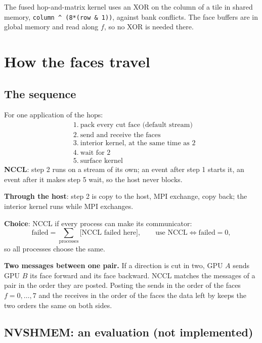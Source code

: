 \documentclass[11pt,a4paper]{article}
\numberwithin{equation}{section}
\newcommand{\code}[1]{\texttt{\small #1}}
\begin{document}
The fused hop-and-matrix kernel uses an XOR on the column of a tile in shared memory,
\code{column \^{} (8*(row \& 1))}, against bank conflicts. The face buffers are in global memory
and read along $f$, so no XOR is needed there.

\section{How the faces travel}

\subsection{The sequence}

For one application of the hops:
\begin{align*}
&1.\ \text{pack every cut face (default stream)}\\
&2.\ \text{send and receive the faces}\\
&3.\ \text{interior kernel, at the same time as 2}\\
&4.\ \text{wait for 2}\\
&5.\ \text{surface kernel}
\end{align*}
\textbf{NCCL}: step 2 runs on a stream of its own; an event after step 1 starts it, an event after
it makes step 5 wait, so the host never blocks.

\textbf{Through the host}: step 2 is copy to the host, MPI exchange, copy back; the interior
kernel runs while MPI exchanges.

\textbf{Choice}: NCCL if every process can make its communicator:
\begin{equation}
\text{failed} = \sum_{\text{processes}} \big[\text{NCCL failed here}\big],\qquad
\text{use NCCL}\iff \text{failed}=0,
\end{equation}
so all processes choose the same.

\textbf{Two messages between one pair.} If a direction is cut in two, GPU $A$ sends GPU $B$ its
face forward and its face backward. NCCL matches the messages of a pair in the order they are
posted. Posting the sends in the order of the faces $f=0,\dots,7$ and the receives in the order
of the faces the data left by keeps the two orders the same on both sides.

\subsection{NVSHMEM: an evaluation (not implemented)}
\end{document}
